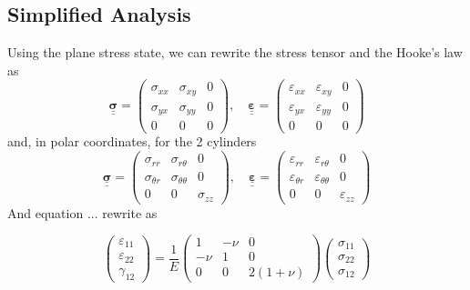 \documentclass[12pt]{article}
\begin{document}
\subsection{Simplified Analysis}
Using the plane stress state, we can rewrite the stress tensor and the Hooke's law as 
\begin{equation}
    \underline{\underline{\boldsymbol{\sigma}}} =
\begin{pmatrix}
    \sigma_{xx} & \sigma_{xy} & 0 \\
    \sigma_{yx} & \sigma_{yy} & 0 \\
    0 & 0 & 0
\end{pmatrix}, \quad
\underline{\underline{\boldsymbol{\varepsilon}}} =
\begin{pmatrix}
    \varepsilon_{xx} & \varepsilon_{xy} & 0 \\
    \varepsilon_{yx} & \varepsilon_{yy} & 0\\
    0 & 0 & 0
\end{pmatrix}
\end{equation}
and, in polar coordinates, for the 2 cylinders 
\begin{equation}
    \underline{\underline{\boldsymbol{\sigma}}} =
    \begin{pmatrix}
        \sigma_{rr} & \sigma_{r\theta} & 0 \\
        \sigma_{\theta r} & \sigma_{\theta\theta} & 0 \\
        0 & 0 & \sigma_{zz}
    \end{pmatrix}, \quad
    \underline{\underline{\boldsymbol{\varepsilon}}} =
    \begin{pmatrix}
        \varepsilon_{rr} & \varepsilon_{r\theta} & 0 \\
        \varepsilon_{\theta r} & \varepsilon_{\theta\theta} & 0 \\
        0 & 0 & \varepsilon_{zz}
    \end{pmatrix}
\end{equation}
And equation ... rewrite as 

\begin{equation}
    \begin{pmatrix}
        \varepsilon_{11} \\
        \varepsilon_{22} \\
        \gamma_{12}
    \end{pmatrix}
    =
    \frac{1}{E}
    \begin{pmatrix}
        1 & -\nu & 0 \\
        -\nu & 1 & 0 \\
        0 & 0 & 2(1+\nu)
    \end{pmatrix}
    \begin{pmatrix}
        \sigma_{11} \\
        \sigma_{22} \\
        \sigma_{12}
    \end{pmatrix}
\end{equation}
\end{document}

